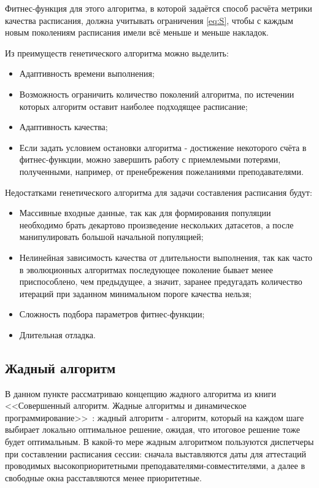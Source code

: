 Фитнес-функция для этого алгоритма, в которой задаётся способ расчёта метрики качества расписания, должна учитывать ограничения \eqref{eq:S}, чтобы с каждым новым поколениям расписания имели всё меньше и меньше накладок.

Из  преимуществ генетического алгоритма можно выделить:
\begin{itemize}
	\item Адаптивность времени выполнения;
	\item Возможность ограничить количество поколений алгоритма, по истечении которых алгоритм оставит наиболее подходящее расписание;
	\item Адаптивность качества;
	\item Если задать условием остановки алгоритма - достижение некоторого счёта в фитнес-функции, можно завершить работу с приемлемыми потерями, полученными, например, от пренебрежения пожеланиями преподавателями.
\end{itemize}

Недостатками генетического алгоритма для задачи составления расписания будут:
\begin{itemize}
	\item Массивные входные данные, так как для формирования популяции необходимо брать декартово произведение нескольких датасетов, а после манипулировать большой начальной популяцией;
	\item Нелинейная зависимость качества от длительности выполнения, так как часто в эволюционных алгоритмах последующее поколение бывает менее приспособлено, чем предыдущее, а значит, заранее предугадать количество итераций при заданном минимальном пороге качества нельзя;
	\item Сложность подбора параметров фитнес-функции;
	\item Длительная отладка.
\end{itemize}

\subsection{Жадный алгоритм}
В данном пункте рассматриваю концепцию жадного алгоритма из книги <<Совершенный алгоритм. Жадные алгоритмы и динамическое программирование>>~\cite{zhad}: жадный алгоритм - алгоритм, который на каждом шаге выбирает локально оптимальное решение, ожидая, что итоговое решение тоже будет оптимальным. В какой-то мере жадным алгоритмом пользуются диспетчеры при составлении расписания сессии: сначала выставляются даты для аттестаций проводимых высокоприоритетными преподавателями-совместителями, а далее в свободные окна расставляются менее приоритетные.

